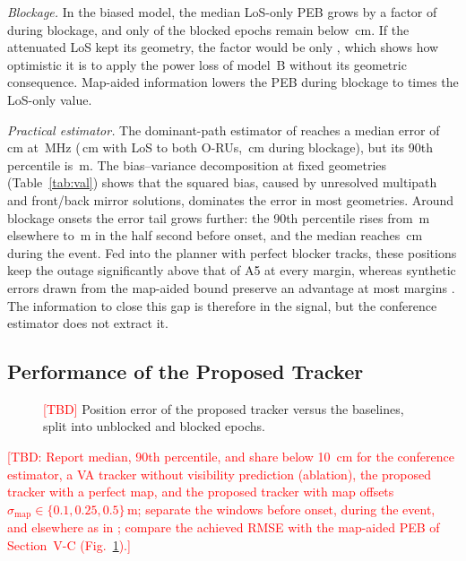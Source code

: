 \documentclass[journal]{IEEEtran}
\newcommand{\tbd}[1]{\textcolor{red}{[TBD: #1]}}
\newcommand{\placeholder}[3]{%
  \fbox{\parbox[c][#2][c]{#1}{\centering\small
  \textcolor{red}{Placeholder (new result): #3}}}}
\begin{document}
\textit{Blockage.} In the biased model, the median LoS-only PEB grows by
a factor of \pRatioLosB{} during blockage, and only
\pDecLosFourHundredBlk{} of the blocked epochs remain below \pDecThr\,cm.
If the attenuated LoS kept its geometry, the factor would be only
\pRatioLosA, which shows how optimistic it is to apply the power loss of
model~B without its geometric consequence. Map-aided information lowers
the PEB during blockage to \pMapToLosBlk{} times the LoS-only value.

\textit{Practical estimator.} The dominant-path estimator of
\cite{natanzi2027wcncB} reaches a median error of \pEstMedFourHundred\,cm
at \pBwC\,MHz (\pEstLosFourHundred\,cm with LoS to both O-RUs,
\pEstBlkFourHundred\,cm during blockage), but its 90th percentile is
\pEstPninetyFourHundred\,m. The bias--variance decomposition at fixed
geometries (Table~\ref{tab:val}) shows that the squared bias, caused by
unresolved multipath and front/back mirror solutions, dominates the
error in most geometries. Around blockage onsets the error tail grows
further: the 90th percentile rises from \pOnsetElsePninety\,m elsewhere to
\pOnsetPreHalfPninety\,m in the half second before onset, and the median
reaches \pOnsetDuringMed\,cm during the event. Fed into the planner with
perfect blocker tracks, these positions keep the outage significantly
above that of A5 at every margin, whereas synthetic errors drawn from the
map-aided bound preserve an advantage at most margins
\cite{natanzi2027wcncB}. The information to close this gap is therefore
in the signal, but the conference estimator does not extract it.

\subsection{Performance of the Proposed Tracker}
\label{sec:tracker}
\begin{figure}[t]
\centering
\placeholder{0.95\columnwidth}{4.2cm}{CDF of the position error for
unblocked and blocked epochs: conference estimator, VA tracker without
visibility prediction, proposed tracker, and samples at the map-aided
PEB.}
\caption{\textcolor{red}{[TBD]} Position error of the proposed tracker
versus the baselines, split into unblocked and blocked epochs.}
\label{fig:trackercdf}
\end{figure}

\tbd{Report median, 90th percentile, and share below \SI{10}{cm} for the
conference estimator, a VA tracker without visibility prediction
(ablation), the proposed tracker with a perfect map, and the proposed
tracker with map offsets $\sigma_{\mathrm{map}}\in\{0.1,0.25,0.5\}$\,m;
separate the windows before onset, during the event, and elsewhere as in
\cite{natanzi2027wcncB}; compare the achieved RMSE with the map-aided
PEB of Section~V-C (Fig.~\ref{fig:trackercdf}).}
\end{document}
